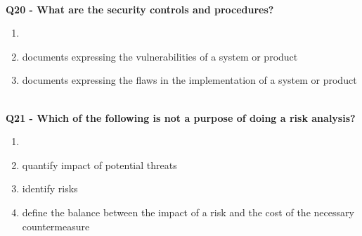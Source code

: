 \textbf{\\Q20 - What are the security controls and procedures?}
\begin{enumerate}
	\item[A.] 
	\item[B.] documents expressing the vulnerabilities of a system or product
	\item[C.] documents expressing the flaws in the implementation of a system or product
\end{enumerate}

\textbf{\\Q21 - Which of the following is not a purpose of doing a risk analysis?}
\begin{enumerate}
	\item[A.] 
	\item[B.] quantify impact of potential threats
	\item[C.] identify risks
	\item[D.] define the balance between the impact of a risk and the cost of the necessary countermeasure
\end{enumerate}
